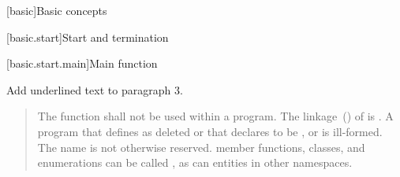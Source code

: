 
\setcounter{chapter}{2}
[basic]{Basic concepts}

\setcounter{section}{5}
[basic.start]{Start and termination}

[basic.start.main]{Main function}

Add underlined text to paragraph 3.


\begin{quote}
	\setcounter{Paras}{4}


The function  shall not be used within
a program.
%
The linkage~() of  is
. A program that defines  as
deleted or that declares  to be
 , or  is ill-formed. 
The name  is
not otherwise reserved. \enterexample member functions, classes, and
enumerations can be called , as can entities in other
namespaces. \exitexample
\end{quote}

%
